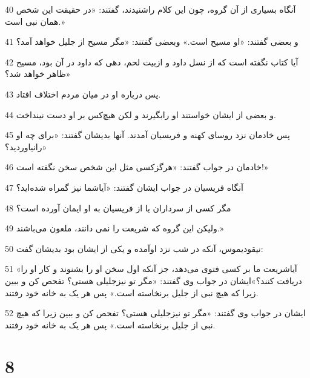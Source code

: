 \par 40 آنگاه بسیاری از آن گروه، چون این کلام راشنیدند، گفتند: «در حقیقت این شخص همان نبی است.»
\par 41 و بعضی گفتند: «او مسیح است.» وبعضی گفتند: «مگر مسیح از جلیل خواهد آمد؟
\par 42 آیا کتاب نگفته است که از نسل داود و ازبیت لحم، دهی که داود در آن بود، مسیح ظاهر خواهد شد؟»
\par 43 پس درباره او در میان مردم اختلاف افتاد.
\par 44 و بعضی از ایشان خواستند او رابگیرند و لکن هیچ‌کس بر او دست نینداخت.
\par 45 پس خادمان نزد روسای کهنه و فریسیان آمدند. آنها بدیشان گفتند: «برای چه او رانیاوردید؟»
\par 46 خادمان در جواب گفتند: «هرگزکسی مثل این شخص سخن نگفته است!»
\par 47 آنگاه فریسیان در جواب ایشان گفتند: «آیاشما نیز گمراه شده‌اید؟
\par 48 مگر کسی از سرداران یا از فریسیان به او ایمان آورده است؟
\par 49 ولیکن این گروه که شریعت را نمی دانند، ملعون می‌باشند.»
\par 50 نیقودیموس، آنکه در شب نزد اوآمده و یکی از ایشان بود بدیشان گفت:
\par 51 «آیاشریعت ما بر کسی فتوی می‌دهد، جز آنکه اول سخن او را بشنوند و کار او را دریافت کنند؟»ایشان در جواب وی گفتند: «مگر تو نیزجلیلی هستی؟ تفحص کن و ببین زیرا که هیچ نبی از جلیل برنخاسته است.» پس هر یک به خانه خود رفتند.
\par 52 ایشان در جواب وی گفتند: «مگر تو نیزجلیلی هستی؟ تفحص کن و ببین زیرا که هیچ نبی از جلیل برنخاسته است.» پس هر یک به خانه خود رفتند.

\chapter{8}

